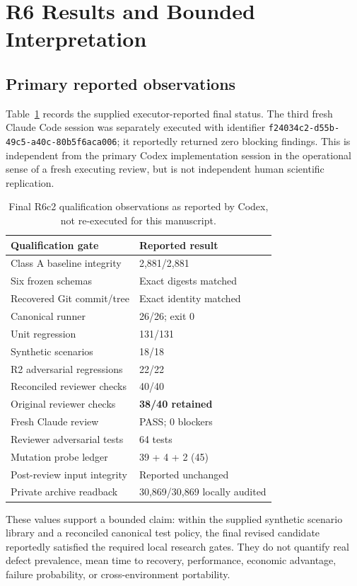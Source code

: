 \documentclass[11pt,twocolumn]{article}
\newcommand{\code}[1]{\texttt{#1}}
\begin{document}
\section{R6 Results and Bounded Interpretation}
\subsection{Primary reported observations}
Table~\ref{tab:r6} records the supplied executor-reported final status. The third fresh Claude Code session was separately executed with identifier \code{f24034c2-d55b-49c5-a40c-80b5f6aca006}; it reportedly returned zero blocking findings. This is independent from the primary Codex implementation session in the operational sense of a fresh executing review, but is not independent human scientific replication.

\begin{table}[t]
\centering\caption{Final R6c2 qualification observations as reported by Codex, not re-executed for this manuscript.}
\label{tab:r6}
\footnotesize
\begin{tabularx}{\columnwidth}{@{}p{}X@{}}
\toprule
\textbf{Qualification gate} & \textbf{Reported result}\\\midrule
Class A baseline integrity & 2,881/2,881\\
Six frozen schemas & Exact digests matched\\
Recovered Git commit/tree & Exact identity matched\\
Canonical runner & 26/26; exit 0\\
Unit regression & 131/131\\
Synthetic scenarios & 18/18\\
R2 adversarial regressions & 22/22\\
Reconciled reviewer checks & 40/40\\
Original reviewer checks & \textbf{38/40 retained}\\
Fresh Claude review & PASS; 0 blockers\\
Reviewer adversarial tests & 64 tests\\
Mutation probe ledger & 39 + 4 + 2 (45)\\
Post-review input integrity & Reported unchanged\\
Private archive readback & 30,869/30,869 locally audited\\\bottomrule
\end{tabularx}
\end{table}

These values support a bounded claim: within the supplied synthetic scenario library and a reconciled canonical test policy, the final revised candidate reportedly satisfied the required local research gates. They do not quantify real defect prevalence, mean time to recovery, performance, economic advantage, failure probability, or cross-environment portability.
\end{document}
